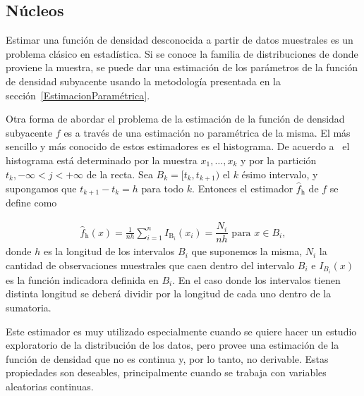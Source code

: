 \subsection{Núcleos}
Estimar una función de densidad desconocida a partir de datos muestrales es un problema clásico en estadística. Si se conoce la familia de distribuciones de donde proviene la muestra, se puede dar una estimación de los parámetros de la función de densidad subyacente usando la metodología presentada en la sección~\ref{EstimacionParamétrica}. 

Otra forma de abordar el problema de la estimación de la función de densidad subyacente $f$ es a través de una estimación no paramétrica de la misma. El más sencillo y más conocido de estos estimadores es el histograma. De acuerdo a~\citet{Scott1992} el histograma está determinado por la muestra ${x_1, \ldots, x_k}$ y por la partición ${t_k, -\infty<j<+\infty}$ de la recta. Sea $B_k=[t_k,t_{k+1})$  el $k$ ésimo intervalo, y supongamos que $t_{k+1}-t_k=h$ para todo $k$. Entonces el estimador $\widehat{f}_\text{h}$ de $f$ se define como 

\begin{align}
\widehat{f}_{\text{h}}(x)=\frac{1}{n h} \sum_{i=1}^n I_{\text{B}_i} (x_i)=\dfrac{N_i}{n h} \text{ para } x \in B_i,
\end{align}
donde $h$ es la longitud de los intervalos $B_i$ que suponemos la misma, $N_i$ la cantidad de observaciones muestrales que caen dentro del intervalo $B_i$ e $I_{B_i}(x)$ es la función indicadora definida en $B_i$. En el caso donde los intervalos tienen distinta longitud se deberá dividir por la longitud de cada uno dentro de la sumatoria.

Este estimador es muy utilizado especialmente cuando se quiere hacer un estudio exploratorio de la distribución de los datos, pero provee una estimación de la función de densidad que no es continua y, por lo tanto, no derivable. Estas propiedades son deseables, principalmente cuando se trabaja con variables aleatorias continuas.

